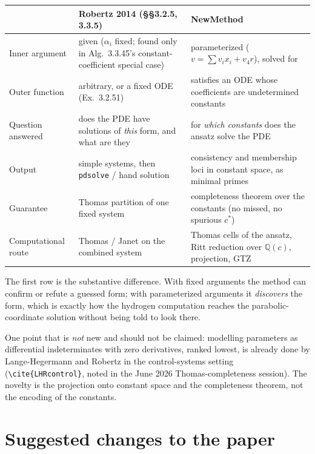 \documentclass[11pt]{article}
\newcommand{\code}[1]{\texttt{#1}}
\newcommand{\QQ}{\mathbb{Q}}
\begin{document}
\begin{center}
\begin{tabularx}{\linewidth}{@{}p{3.3cm}XX@{}}
\toprule
 & Robertz 2014 (\S\S3.2.5, 3.3.5) & NewMethod \\
\midrule
Inner argument & given ($\alpha_i$ fixed; found only in Alg.~3.3.45's
  constant-coefficient special case) & parameterized
  ($v=\sum v_i x_i + v_4 r$), solved for \\
Outer function & arbitrary, or a fixed ODE (Ex.~3.2.51) & satisfies an ODE
  whose coefficients are undetermined constants \\
Question answered & does the PDE have solutions of \emph{this} form, and what
  are they & for \emph{which constants} does the ansatz solve the PDE \\
Output & simple systems, then \code{pdsolve} / hand solution &
  consistency and membership loci in constant space, as minimal primes \\
Guarantee & Thomas partition of one fixed system & completeness theorem over
  the constants (no missed, no spurious $c^*$) \\
Computational route & Thomas / Janet on the combined system &
  Thomas cells of the ansatz, Ritt reduction over $\QQ(c)$, projection, GTZ \\
\bottomrule
\end{tabularx}
\end{center}

The first row is the substantive difference. With fixed arguments the method
can confirm or refute a guessed form; with parameterized arguments it
\emph{discovers} the form, which is exactly how the hydrogen computation
reaches the parabolic-coordinate solution without being told to look there.

One point that is \emph{not} new and should not be claimed: modelling
parameters as differential indeterminates with zero derivatives, ranked
lowest, is already done by Lange-Hegermann and Robertz in the control-systems
setting (\verb|\cite{LHRcontrol}|, noted in the June 2026 Thomas-completeness
session). The novelty is the projection onto constant space and the
completeness theorem, not the encoding of the constants.

\section{Suggested changes to the paper}
\label{sec:paper}
\end{document}
